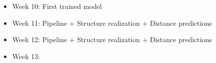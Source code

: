 \documentclass[11pt]{article}
\begin{document}
\begin{itemize}
    \item Week 10: First trained model
    \item Week 11: Pipeline + Structure realization + Distance predictions
    \item Week 12: Pipeline + Structure realization + Distance predictions
    \item Week 13: 
\end{itemize}
\end{document}
